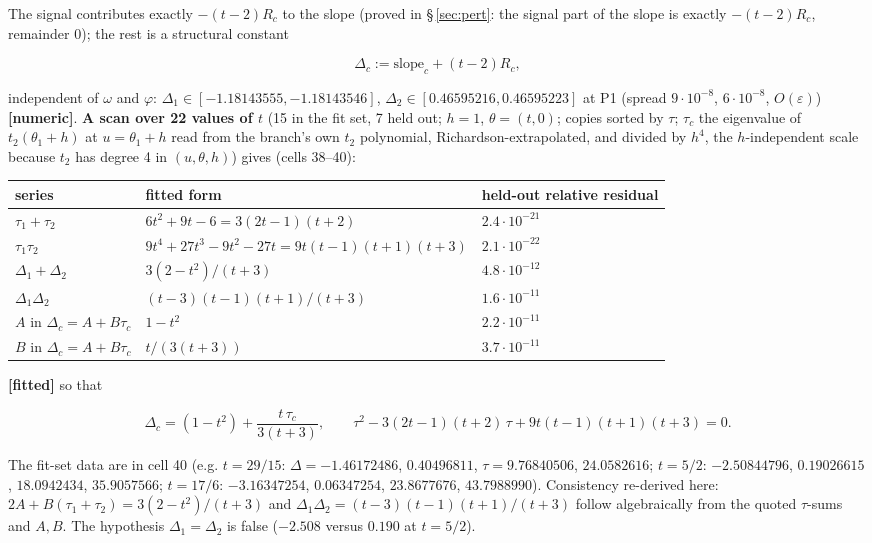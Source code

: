 \documentclass[10pt]{article}
\begin{document}
The signal contributes exactly $-(t-2)R_c$ to the slope (proved in \S\,\ref{sec:pert}: the signal part of the slope is exactly $-(t-2)R_c$, remainder 0); the rest is a structural constant

\[
\Delta_c:=\mathrm{slope}_c+(t-2)R_c,
\]

independent of $\omega$ and $\varphi$: $\Delta_1\in[-1.18143555,-1.18143546]$, $\Delta_2\in[0.46595216,0.46595223]$ at P1 (spread $9\cdot10^{-8}$, $6\cdot10^{-8}$, $O(\varepsilon)$) \textbf{[numeric]}. \textbf{A scan over 22 values of $t$} (15 in the fit set, 7 held out; $h=1$, $\theta=(t,0)$; copies sorted by $\tau$; $\tau_c$ the eigenvalue of $t_2(\theta_1+h)$ at $u=\theta_1+h$ read from the branch's own $t_2$ polynomial, Richardson-extrapolated, and divided by $h^4$, the $h$-independent scale because $t_2$ has degree 4 in $(u,\theta,h)$) gives (cells 38--40):

\begin{center}\small\setlength{\tabcolsep}{3pt}\begin{longtable}{@{}lll@{}}\toprule
\textbf{series} & \textbf{fitted form} & \textbf{held-out relative residual} \\\midrule\endhead
$\tau_1+\tau_2$ & $6t^2+9t-6=3(2t-1)(t+2)$ & $2.4\cdot10^{-21}$ \\
$\tau_1\tau_2$ & $9t^4+27t^3-9t^2-27t=9t(t-1)(t+1)(t+3)$ & $2.1\cdot10^{-22}$ \\
$\Delta_1+\Delta_2$ & $3(2-t^2)/(t+3)$ & $4.8\cdot10^{-12}$ \\
$\Delta_1\Delta_2$ & $(t-3)(t-1)(t+1)/(t+3)$ & $1.6\cdot10^{-11}$ \\
$A$ in $\Delta_c=A+B\tau_c$ & $1-t^2$ & $2.2\cdot10^{-11}$ \\
$B$ in $\Delta_c=A+B\tau_c$ & $t/(3(t+3))$ & $3.7\cdot10^{-11}$ \\
\bottomrule\end{longtable}\end{center}

\textbf{[fitted]} so that

\[
\Delta_c=(1-t^2)+\frac{t\,\tau_c}{3(t+3)},\qquad \tau^2-3(2t-1)(t+2)\,\tau+9t(t-1)(t+1)(t+3)=0 .
\]

The fit-set data are in cell 40 (e.g. $t=29/15$: $\Delta=-1.46172486$, $0.40496811$, $\tau=9.76840506$, $24.0582616$; $t=5/2$: $-2.50844796$, $0.19026615$, $18.0942434$, $35.9057566$; $t=17/6$: $-3.16347254$, $0.06347254$, $23.8677676$, $43.7988990$). Consistency re-derived here: $2A+B(\tau_1+\tau_2)=3(2-t^2)/(t+3)$ and $\Delta_1\Delta_2=(t-3)(t-1)(t+1)/(t+3)$ follow algebraically from the quoted $\tau$-sums and $A,B$. The hypothesis $\Delta_1=\Delta_2$ is false ($-2.508$ versus $0.190$ at $t=5/2$).
\end{document}

